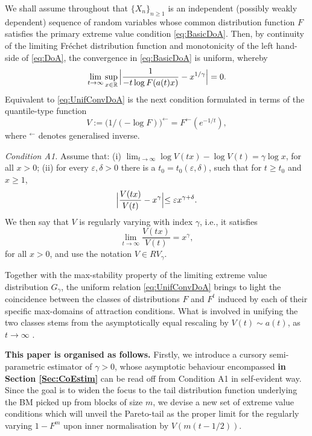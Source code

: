 \documentclass[11pt, a4paper, oneside]{article}
\numberwithin{equation}{section}
\theoremstyle{plain}
\theoremstyle{definition}
\newcommand{\field}[1]{\mathbb{#1}}
\newcommand{\real}{\ensuremath{{\field{R}}}}
\newcommand{\limit}[1]{\ensuremath{\displaystyle {\lim_{#1 \rightarrow{\infty}}}}}
\newcommand{\suprem}[1]{\ensuremath{\displaystyle {\sup_{#1}}}}
\begin{document}
We shall assume throughout that $\{X_{n}\}_{n \geq 1}$ is an independent (possibly weakly dependent) sequence of random variables whose common distribution function $F$ satisfies the primary extreme value condition \eqref{eq:BasicDoA}. Then, by continuity of the limiting Fr\'echet distribution function  and monotonicity of the left hand-side of \eqref{eq:DoA}, the convergence in \eqref{eq:BasicDoA} is uniform, whereby
\begin{equation}\label{eq:UnifConvDoA}
	\limit{t} \, \suprem{x \in \real} \,\Bigl| \frac{1}{- t \log F(a(t)x)} - x^{1/\gamma}\Bigr| = 0.
\end{equation}
Equivalent to \eqref{eq:UnifConvDoA} is the next condition formulated in terms of the quantile-type function
\begin{equation*}
	V:= \bigl( 1/ (-\log F) \bigr)^{\leftarrow}= F^{\leftarrow} (e^{-1/t}),
\end{equation*}
where $^{\leftarrow}$ denotes generalised inverse.

\emph{Condition A1.} Assume that: %
(i) $ \lim_{t\rightarrow \infty}
	\log V(tx) - \log V(t) = \gamma \log x$, for all $x>0$; (ii)
for every $\varepsilon,\delta>0$ there is a $t_0= t_0(\varepsilon,\delta)$, such that for $t\geq t_0$ and $x\geq 1$,
\begin{equation*}
    \Bigl|\frac{V(tx)}{V(t)}-x^{{\gamma}}\Bigl|\leq \varepsilon x^{{\gamma}+\delta}.
\end{equation*}
We then say that $V$ is regularly varying with index $\gamma$, i.e., it satisfies 
\begin{equation*}%
    \limit{t} \frac{V(tx)}{V(t)}=x^{\gamma},
\end{equation*}
for all $x>0$, and use the notation $V \in RV_{\gamma}$.

Together with the max-stability property of the limiting extreme value distribution $G_\gamma$, the uniform relation \eqref{eq:UnifConvDoA} brings to light the coincidence between the classes of distributions $F$ and $F^{t}$ induced by each of their specific max-domains of attraction conditions. What is involved in unifying the two classes stems from the asymptotically equal rescaling by $V(t) \sim a(t)$, as $t \rightarrow \infty$ \citep[cf.][Proposition 2.12, p.108]{Resnick1987}. 


\textbf{This paper is organised as follows.} Firstly, we introduce a cursory semi-parametric estimator of $\gamma>0$, whose asymptotic behaviour encompassed \textbf{in Section \ref{Sec:CoEstim}} can be read off from Condition A1 in self-evident way. Since the goal is to widen the focus to the tail distribution function underlying the BM picked up from blocks of size $m$, we devise a new set of extreme value conditions which will unveil the Pareto-tail as the proper limit for the regularly varying $1-F^m$ upon inner normalisation by $V(m(t-1/2))$.
\end{document}
